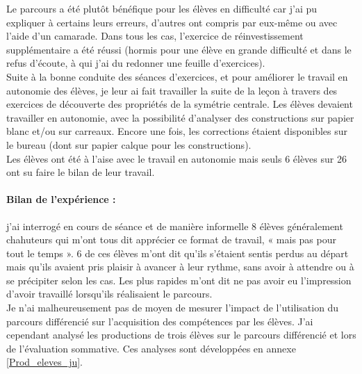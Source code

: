 Le parcours a été plutôt bénéfique pour les élèves en difficulté car j'ai pu expliquer à certains leurs erreurs, d'autres ont compris par eux-même ou avec l'aide d'un camarade. Dans tous les cas, l'exercice de réinvestissement supplémentaire a été réussi (hormis pour une élève en grande difficulté et dans le refus d'écoute, à qui j'ai du redonner une feuille d'exercices).\\
Suite à la bonne conduite des séances d'exercices, et pour améliorer le travail en autonomie des élèves, je leur ai fait travailler la suite de la leçon à travers des exercices de découverte des propriétés de la symétrie centrale. Les élèves devaient travailler en autonomie, avec la possibilité d'analyser des constructions sur papier blanc et/ou sur carreaux. Encore une fois, les corrections étaient disponibles sur le bureau (dont sur papier calque pour les constructions).\\
Les élèves ont été à l'aise avec le travail en autonomie mais seuls 6 élèves sur 26 ont su faire le bilan de leur travail.

\paragraph{Bilan de l'expérience :}j'ai interrogé en cours de séance et de manière informelle 8 élèves généralement chahuteurs qui m'ont tous dit apprécier ce format de travail, « mais pas pour tout le temps ». 6 de ces élèves m'ont dit qu'ils s'étaient sentis perdus au départ mais qu'ils avaient pris plaisir à avancer à leur rythme, sans avoir  à attendre ou à se précipiter selon les cas. Les plus rapides m'ont dit ne pas avoir eu l'impression d'avoir travaillé lorsqu'ils réalisaient le parcours.\\
Je n'ai malheureusement pas de moyen de mesurer l'impact de l'utilisation du parcours différencié sur l'acquisition des compétences par les élèves. J'ai cependant analysé les productions de trois élèves sur le parcours différencié et lors de l'évaluation sommative. Ces analyses sont développées en annexe \ref{Prod_eleves_ju}.

